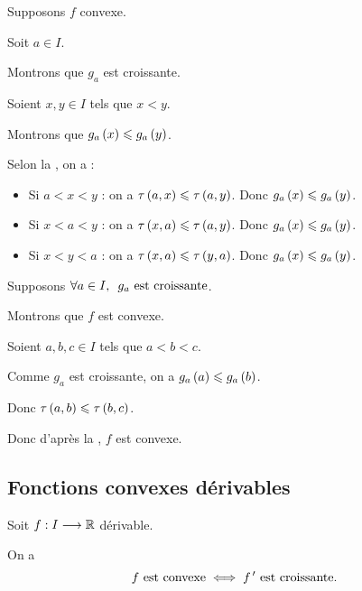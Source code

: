 \begin{dem}
\impdir

Supposons \(f\) convexe.

Soit \(a\in I\).

Montrons que \(g_a\) est croissante.

Soient \(x,y\in I\) tels que \(x<y\).

Montrons que \(g_a\left(x\right)\leqslant g_a\left(y\right)\).

Selon la , on a :

\begin{itemize}
\item Si \(a<x<y\) : on a \(\tau\left(a,x\right)\leqslant\tau\left(a,y\right)\). Donc \(g_a\left(x\right)\leqslant g_a\left(y\right)\). \\

\item Si \(x<a<y\) : on a \(\tau\left(x,a\right)\leqslant\tau\left(a,y\right)\). Donc \(g_a\left(x\right)\leqslant g_a\left(y\right)\). \\

\item Si \(x<y<a\) : on a \(\tau\left(x,a\right)\leqslant\tau\left(y,a\right)\). Donc \(g_a\left(x\right)\leqslant g_a\left(y\right)\).
\end{itemize}

\imprec

Supposons \(\quantifs{\forall a\in I}g_a\text{ est croissante}\).

Montrons que \(f\) est convexe.

Soient \(a,b,c\in I\) tels que \(a<b<c\).

Comme \(g_a\) est croissante, on a \(g_a\left(a\right)\leqslant g_a\left(b\right)\).

Donc \(\tau\left(a,b\right)\leqslant\tau\left(b,c\right)\).

Donc d'après la , \(f\) est convexe.
\end{dem}

\subsection{Fonctions convexes dérivables}

\begin{prop}
Soit \(f:I\longrightarrow\mathbb{R}\) dérivable.

On a \[f\text{ est convexe}\iff f^{\,\prime}\text{ est croissante}.\]
\end{prop}

